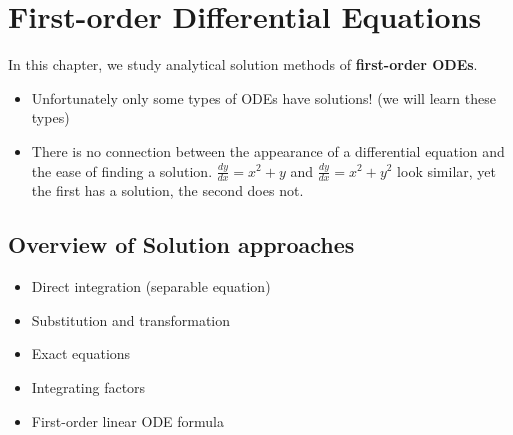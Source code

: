 %
%
%
%
%
%
%
%

\chapter{First-order Differential Equations}
In this chapter, we study analytical solution methods  of  \textbf{first-order  ODEs}.\\
\begin{itemize}
\item Unfortunately only some types of ODEs have solutions! (we will learn these types)
\item There is no connection between the appearance of a differential equation and the ease of finding a solution. $\frac{dy}{dx}=x^2+y$ and $\frac{dy}{dx}=x^2+y^2$ look similar, yet the first has a solution, the second does not.
\end{itemize}

\section{Overview of Solution approaches}
\begin{itemize}
\item Direct integration (separable equation)
\item Substitution and transformation
\item Exact equations
\item Integrating factors
\item First-order linear ODE formula
\end{itemize}




